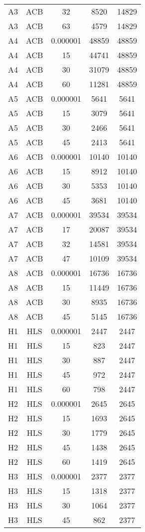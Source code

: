 \begin{center}
\begin{longtable}{ccccc}
A3	&	ACB	&	32	&	8520	&	14829	\\
A3	&	ACB	&	63	&	4579	&	14829	\\
A4	&	ACB	&	0.000001	&	48859	&	48859	\\
A4	&	ACB	&	15	&	44741	&	48859	\\
A4	&	ACB	&	30	&	31079	&	48859	\\
A4	&	ACB	&	60	&	11281	&	48859	\\
A5	&	ACB	&	0.000001	&	5641	&	5641	\\
A5	&	ACB	&	15	&	3079	&	5641	\\
A5	&	ACB	&	30	&	2466	&	5641	\\
A5	&	ACB	&	45	&	2413	&	5641	\\
A6	&	ACB	&	0.000001	&	10140	&	10140	\\
A6	&	ACB	&	15	&	8912	&	10140	\\
A6	&	ACB	&	30	&	5353	&	10140	\\
A6	&	ACB	&	45	&	3681	&	10140	\\
A7	&	ACB	&	0.000001	&	39534	&	39534	\\
A7	&	ACB	&	17	&	20087	&	39534	\\
A7	&	ACB	&	32	&	14581	&	39534	\\
A7	&	ACB	&	47	&	10109	&	39534	\\
A8	&	ACB	&	0.000001	&	16736	&	16736	\\
A8	&	ACB	&	15	&	11449	&	16736	\\
A8	&	ACB	&	30	&	8935	&	16736	\\
A8	&	ACB	&	45	&	5145	&	16736	\\
H1	&	HLS	&	0.000001	&	2447	&	2447	\\
H1	&	HLS	&	15	&	823	&	2447	\\
H1	&	HLS	&	30	&	887	&	2447	\\
H1	&	HLS	&	45	&	972	&	2447	\\
H1	&	HLS	&	60	&	798	&	2447	\\
H2	&	HLS	&	0.000001	&	2645	&	2645	\\
H2	&	HLS	&	15	&	1693	&	2645	\\
H2	&	HLS	&	30	&	1779	&	2645	\\
H2	&	HLS	&	45	&	1438	&	2645	\\
H2	&	HLS	&	60	&	1419	&	2645	\\
H3	&	HLS	&	0.000001	&	2377	&	2377	\\
H3	&	HLS	&	15	&	1318	&	2377	\\
H3	&	HLS	&	30	&	1064	&	2377	\\
H3	&	HLS	&	45	&	862	&	2377	\\

\end{longtable}
\end{center}
